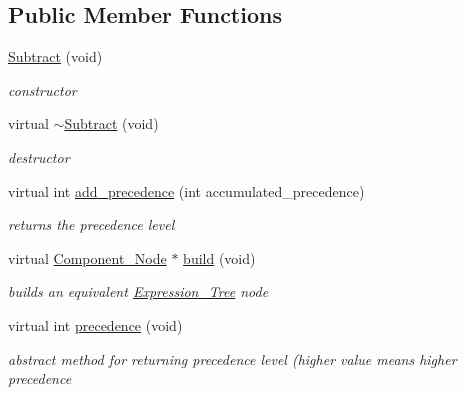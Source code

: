 \subsection*{Public Member Functions}
\begin{DoxyCompactItemize}
\item 
\hyperlink{classMadara_1_1Expression__Tree_1_1Subtract_a4d13088a88a55cf986a67b203603fb31}{Subtract} (void)
\begin{DoxyCompactList}\small\item\em constructor \item\end{DoxyCompactList}\item 
virtual \hyperlink{classMadara_1_1Expression__Tree_1_1Subtract_a595d2d4ccec460d9cf8618d801b11fe9}{$\sim$Subtract} (void)
\begin{DoxyCompactList}\small\item\em destructor \item\end{DoxyCompactList}\item 
virtual int \hyperlink{classMadara_1_1Expression__Tree_1_1Subtract_aafdcc323e2674868b0ca462b650c9dcf}{add\_\-precedence} (int accumulated\_\-precedence)
\begin{DoxyCompactList}\small\item\em returns the precedence level \item\end{DoxyCompactList}\item 
virtual \hyperlink{classMadara_1_1Expression__Tree_1_1Component__Node}{Component\_\-Node} $\ast$ \hyperlink{classMadara_1_1Expression__Tree_1_1Subtract_ac912adf0d401821e21c738f2cd13cce9}{build} (void)
\begin{DoxyCompactList}\small\item\em builds an equivalent \hyperlink{classMadara_1_1Expression__Tree_1_1Expression__Tree}{Expression\_\-Tree} node \item\end{DoxyCompactList}\item 
virtual int \hyperlink{classMadara_1_1Expression__Tree_1_1Symbol_ac060dedb8d16864591b259df375109b3}{precedence} (void)
\begin{DoxyCompactList}\small\item\em abstract method for returning precedence level (higher value means higher precedence \item\end{DoxyCompactList}\end{DoxyCompactItemize}
